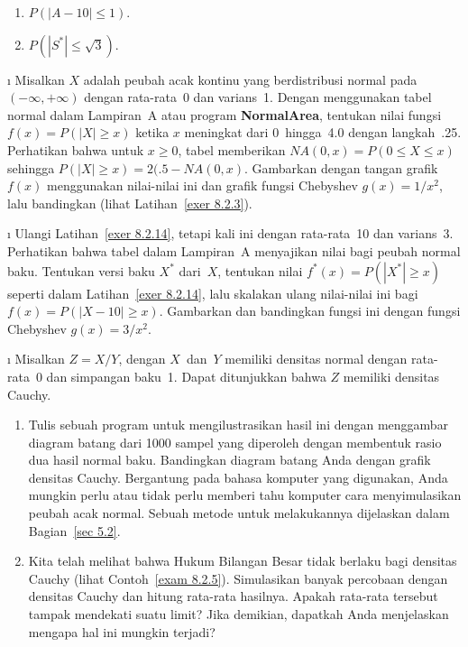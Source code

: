 {\begin{LJSItem}
\begin{enumerate}
\item $P(|A - 10| \leq 1)$.

\item $P(|S^*| \leq \sqrt3)$.
\end{enumerate}

\i\label{exer 8.2.14} Misalkan $X$ adalah peubah acak kontinu yang berdistribusi
normal pada $(-\infty,+\infty)$ dengan rata-rata~0 dan varians~1.  Dengan menggunakan
tabel normal dalam Lampiran~A atau program {\bf NormalArea},
tentukan nilai fungsi $f(x) = P(|X| \geq x)$ ketika $x$ meningkat dari
0~hingga~4.0 dengan langkah~.25.  Perhatikan bahwa untuk $x \geq 0$, tabel memberikan
$ NA(0,x) = P(0 \leq X \leq x)$ sehingga $P(|X| \geq x) = 2(.5 - NA(0,x)$.
Gambarkan dengan tangan
grafik~$f(x)$ menggunakan nilai-nilai ini dan grafik fungsi Chebyshev
$g(x) = 1/x^2$, lalu bandingkan (lihat Latihan~\ref{exer 8.2.3}).

\i\label{exer 8.2.109} Ulangi Latihan~\ref{exer 8.2.14}, tetapi kali ini dengan rata-rata~10 dan
varians~3.  Perhatikan bahwa tabel dalam Lampiran~A menyajikan nilai bagi
peubah normal baku.  Tentukan versi baku $X^*$ dari~$X$, tentukan
nilai $f^*(x) = P(|X^*| \geq x)$ seperti dalam Latihan~\ref{exer 8.2.14}, lalu
skalakan ulang nilai-nilai ini bagi $f(x) = P(|X -10| \geq x)$.  Gambarkan dan bandingkan
fungsi ini dengan fungsi Chebyshev $g(x) = 3/x^2$.

\i\label{exer 8.2.110} Misalkan $Z = X/Y$, dengan $X$~dan~$Y$ memiliki densitas normal dengan rata-rata~0 dan
simpangan baku~1.  Dapat ditunjukkan bahwa $Z$ memiliki densitas Cauchy.
\begin{enumerate}
\item Tulis sebuah program untuk mengilustrasikan hasil ini dengan menggambar diagram batang dari
1000 sampel yang diperoleh dengan membentuk rasio dua hasil normal baku. 
Bandingkan diagram batang Anda dengan grafik densitas Cauchy.  Bergantung pada
bahasa komputer yang digunakan, Anda mungkin perlu atau tidak perlu memberi tahu komputer cara menyimulasikan
peubah acak normal.  Sebuah metode untuk melakukannya dijelaskan dalam Bagian~\ref{sec 5.2}.

\item Kita telah melihat bahwa Hukum Bilangan Besar tidak berlaku bagi
densitas Cauchy (lihat Contoh~\ref{exam 8.2.5}).  Simulasikan banyak
percobaan dengan densitas Cauchy dan hitung rata-rata hasilnya.  Apakah
rata-rata tersebut tampak mendekati suatu limit?  Jika demikian, dapatkah Anda menjelaskan mengapa
hal ini mungkin terjadi?
\end{enumerate}


\end{LJSItem}}
